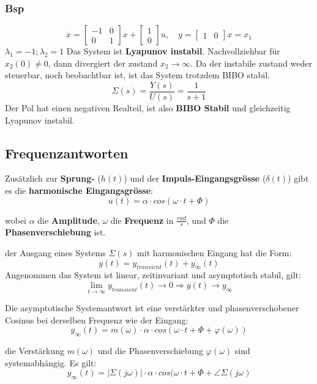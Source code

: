         \subsubsection{Bsp}
            \[\dot{x}=
            \begin{bmatrix}
            -1 & 0 \\
            0 & 1
            \end{bmatrix}
            x+
            \begin{bmatrix}
            1 \\
            0
            \end{bmatrix}
            u, \quad y=\begin{bmatrix} 1 & 0 \end{bmatrix}x = x_1
            \]
            $\lambda_1=-1; \lambda_2=1$ Das System ist \textbf{Lyapunov instabil}. Nachvollziehbar für $x_2(0) \neq0$, dann divergiert der zustand $x_2\to\infty$. Da der instabile zustand weder steuerbar, noch beobachtbar ist, ist das System trotzdem BIBO stabil.
            \[\Sigma(s)=\frac{Y(s)}{U(s)}=\frac{1}{s+1}\]
            Der Pol hat einen negativen Realteil, ist also \textbf{BIBO Stabil} und gleichzeitig Lyapunov instabil.
        \subsection{Frequenzantworten}
        Zusätzlich zur \textbf{Sprung-} ($h(t)$) und der \textbf{Impuls-Eingangsgrösse} ($\delta(t)$) gibt es die \textbf{harmonische Eingangsgrösse}: \[u(t) = \alpha\cdot cos(\omega\cdot t + \Phi)\]
        
        wobei $\alpha$ die \textbf{Amplitude}, $\omega$ die \textbf{Frequenz} in $\frac{rad}{s}$, und $\Phi$ die \textbf{Phasenverschiebung} ist.
        
        der Ausgang eines Systems $\Sigma(s)$ mit harmonischen Eingang hat die Form:
        \[y(t) = y_{transient}(t) + y_\infty(t) \]
        Angenommen das System ist linear, zeitinvariant und asymptotisch stabil, gilt: 
        \[\displaystyle\lim_{t\to \infty} y_{transient}(t) \rightarrow 0 \Rightarrow y(t) \rightarrow y_{\infty}\]
        
        Die asymptotische Systemantwort ist eine verstärkter und phasenverschobener Cosinus bei derselben Frequenz wie der Eingang: 
        \[y_{\infty}(t) = m(\omega)\cdot \alpha \cdot cos(\omega \cdot t + \Phi + \varphi(\omega))\]
        
        die Verstärkung $m(\omega)$ und die Phasenverschiebung $\varphi(\omega)$ sind systemabhängig. Es gilt:
        \[y_{\infty}(t) = |\Sigma(j\omega)| \cdot \alpha \cdot cos(\omega\cdot t+ \Phi + \angle \Sigma(j\omega)\]
        
